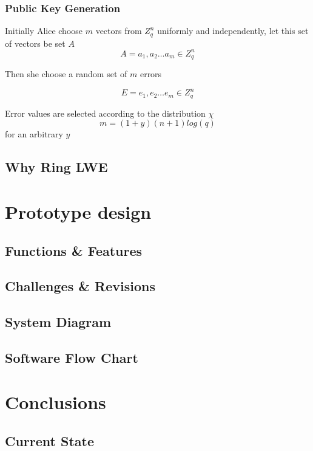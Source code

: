 \documentclass{article}
\begin{document}
\subsubsection{Public Key Generation}
Initially Alice choose $m$ vectors from $Z_q^n$ uniformly and independently, let this set of vectors be set $A$
\begin{equation*}
A = a_1, a_2… a_m \in Z_q^n
\end{equation*}

Then she choose a random set of $m$ errors

\begin{equation*}
E = e_1, e_2… e_m \in Z_q^n
\end{equation*}

Error values are selected according to the distribution $\chi$
\begin{equation*}
m = (1+y)(n+1)log(q) 
\end{equation*}
for an arbitrary $y$


\subsection{Why Ring LWE}

\section{Prototype design}
\subsection{Functions \& Features}
\subsection{Challenges \& Revisions}
\subsection{System Diagram}
\subsection{Software Flow Chart}

\section{Conclusions}
\subsection{Current State}
\end{document}
